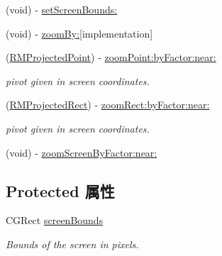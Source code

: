 \begin{DoxyCompactItemize}
\item 
(void) -\/ \hyperlink{interface_r_m_mercator_to_screen_projection_ab2bd98049aaf4340cb2291b13588f77d}{set\-Screen\-Bounds\-:}
\item 
(void) -\/ \hyperlink{interface_r_m_mercator_to_screen_projection_a0882ed84fe7346f3a9b8f4e63e2dfa0a}{zoom\-By\-:}{\ttfamily  \mbox{[}implementation\mbox{]}}
\item 
(\hyperlink{struct_r_m_projected_point}{R\-M\-Projected\-Point}) -\/ \hyperlink{interface_r_m_mercator_to_screen_projection_a5cb02ad7176d0523eb57471fc99e3c7c}{zoom\-Point\-:by\-Factor\-:near\-:}
\begin{DoxyCompactList}\small\item\em pivot given in screen coordinates. \end{DoxyCompactList}\item 
(\hyperlink{struct_r_m_projected_rect}{R\-M\-Projected\-Rect}) -\/ \hyperlink{interface_r_m_mercator_to_screen_projection_a99a67d660114f633f116ebf688642cdc}{zoom\-Rect\-:by\-Factor\-:near\-:}
\begin{DoxyCompactList}\small\item\em pivot given in screen coordinates. \end{DoxyCompactList}\item 
(void) -\/ \hyperlink{interface_r_m_mercator_to_screen_projection_ad47c361352cdff2e4689721db9fb6c52}{zoom\-Screen\-By\-Factor\-:near\-:}
\end{DoxyCompactItemize}
\subsection*{Protected 属性}
\begin{DoxyCompactItemize}
\item 
C\-G\-Rect \hyperlink{interface_r_m_mercator_to_screen_projection_ac28d9acefc1c419405f7331d9038675a}{screen\-Bounds}
\begin{DoxyCompactList}\small\item\em Bounds of the screen in pixels. \end{DoxyCompactList}\end{DoxyCompactItemize}
